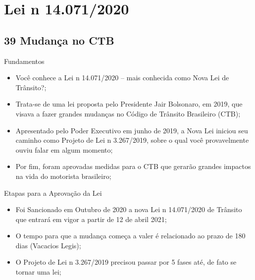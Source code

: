 \documentclass{beamer}
\begin{document}
\section{Lei n 14.071/2020}
\subsection{39 Mudança no CTB}
\begin{frame}{Fundamentos}
    \begin{itemize}
        \item \justifying Você conhece a Lei n 14.071/2020 – mais conhecida como Nova Lei de Trânsito?;
        \item \justifying Trata-se de uma lei proposta pelo Presidente Jair Bolsonaro, em 2019, que visava a fazer grandes mudanças no Código de Trânsito Brasileiro (CTB);
        \item \justifying Apresentado pelo Poder Executivo em junho de 2019, a Nova Lei iniciou seu caminho como Projeto de Lei n 3.267/2019, sobre o qual você provavelmente ouviu falar em algum momento;
        \item \justifying Por fim, foram aprovadas medidas para o CTB que gerarão grandes impactos na vida do motorista brasileiro;
    \end{itemize}
\end{frame}
\begin{frame}{Etapas para a Aprovação da Lei}
    \begin{itemize}
        \item \justifying Foi Sancionado em Outubro de 2020 a nova Lei n 14.071/2020 de Trânsito que entrará em vigor a partir de 12 de abril 2021;
        \item \justifying O tempo para que a mudança começa a valer é relacionado ao prazo de 180 dias (Vacacios Legis);
        \item \justifying O Projeto de Lei n 3.267/2019 precisou passar por 5 fases até, de fato se tornar uma lei;
    \end{itemize}
\end{frame}
\end{document}
